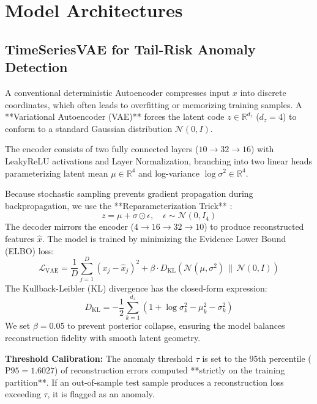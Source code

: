 \documentclass[10pt,twocolumn,letterpaper]{article}
\begin{document}
\section{Model Architectures}

\subsection{TimeSeriesVAE for Tail-Risk Anomaly Detection}
A conventional deterministic Autoencoder compresses input $x$ into discrete coordinates, which often leads to overfitting or memorizing training samples. A **Variational Autoencoder (VAE)** forces the latent code $z \in \mathbb{R}^{d_z}$ ($d_z = 4$) to conform to a standard Gaussian distribution $\mathcal{N}(0, I)$.

The encoder consists of two fully connected layers ($10 \to 32 \to 16$) with LeakyReLU activations and Layer Normalization, branching into two linear heads parameterizing latent mean $\mu \in \mathbb{R}^4$ and log-variance $\log \sigma^2 \in \mathbb{R}^4$.

Because stochastic sampling prevents gradient propagation during backpropagation, we use the **Reparameterization Trick** \cite{kingma2013auto}:
\begin{equation}
    z = \mu + \sigma \odot \epsilon, \quad \epsilon \sim \mathcal{N}(0, I_4)
\end{equation}
The decoder mirrors the encoder ($4 \to 16 \to 32 \to 10$) to produce reconstructed features $\hat{x}$. The model is trained by minimizing the Evidence Lower Bound (ELBO) loss:
\begin{equation}
    \mathcal{L}_{\text{VAE}} = \frac{1}{D}\sum_{j=1}^{D}(x_j - \hat{x}_j)^2 + \beta \cdot D_{\text{KL}}\left(\mathcal{N}(\mu, \sigma^2) \,\|\, \mathcal{N}(0, I)\right)
\end{equation}
The Kullback-Leibler (KL) divergence has the closed-form expression:
\begin{equation}
    D_{\text{KL}} = -\frac{1}{2}\sum_{k=1}^{d_z}\left(1 + \log\sigma_k^2 - \mu_k^2 - \sigma_k^2\right)
\end{equation}
We set $\beta = 0.05$ to prevent posterior collapse, ensuring the model balances reconstruction fidelity with smooth latent geometry.

\textbf{Threshold Calibration:} The anomaly threshold $\tau$ is set to the 95th percentile ($\text{P95} = 1.6027$) of reconstruction errors computed **strictly on the training partition**. If an out-of-sample test sample produces a reconstruction loss exceeding $\tau$, it is flagged as an anomaly.
\end{document}
